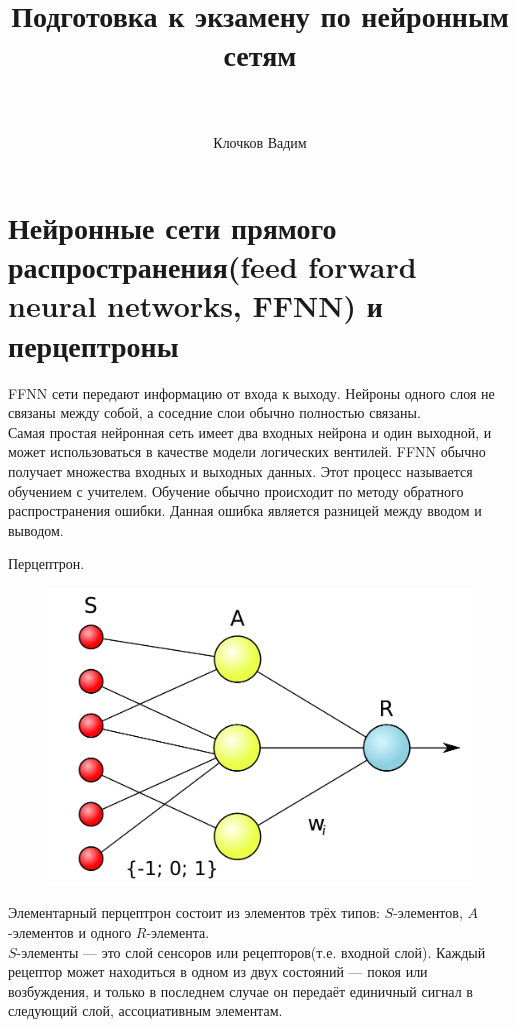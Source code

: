 \documentclass[paper=a4, fontsize=11pt]{scrartcl} %
\title{	
	\huge Подготовка к экзамену по нейронным сетям \\ %
	\horrule{2pt} \\[0.5cm] %
}
\author{Клочков Вадим} %
\date{}
\numberwithin{equation}{section} %
\numberwithin{figure}{section} %
\numberwithin{table}{section} %
\begin{document}
	
	\maketitle %
	
	\section{Нейронные сети прямого распространения(feed forward neural networks, FFNN) и перцептроны}
	FFNN сети передают информацию от входа к выходу. Нейроны одного слоя не связаны между собой, а соседние слои обычно полностью связаны. \\
	Самая простая нейронная сеть имеет два входных нейрона и один выходной, и может использоваться в качестве модели логических вентилей. FFNN обычно получает множества входных и выходных данных. Этот процесс называется обучением с учителем. Обучение обычно происходит по методу обратного распространения ошибки. Данная ошибка является разницей между вводом и выводом.
	
	Перцептрон.
	
	\begin{figure}[h!]
		\centering
		\includegraphics[scale=0.25]{perc}
	\end{figure}

	Элементарный перцептрон состоит из элементов трёх типов: $S$-элементов, $A$-элементов и одного $R$-элемента. \\
	$S$-элементы — это слой сенсоров или рецепторов(т.е. входной слой). Каждый рецептор может находиться в одном из двух состояний — покоя или возбуждения, и только в последнем случае он передаёт единичный сигнал в следующий слой, ассоциативным элементам.
	
\end{document}
